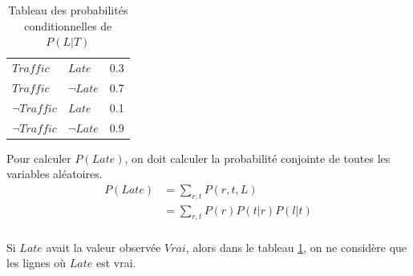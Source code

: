\begin{enumerate}
    \begin{table}[H]
        \centering
        \begin{tabular}{|l|l|l|}
            \hline
            $Traffic$ & $Late$ & 0.3 \\ 
            $Traffic$ & $\neg Late$ & 0.7 \\
            $\neg Traffic$ & $Late$ & 0.1 \\
            $\neg Traffic$ & $\neg Late$ & 0.9 \\
            \hline
        \end{tabular}
        \caption{Tableau des probabilités conditionnelles de $P(L | T)$}
        \label{tabl:late}
    \end{table}
    Pour calculer $P(Late)$, on doit calculer la probabilité conjointe de toutes les variables aléatoires. 
    \begin{align*}
        P(Late) &= \sum_{r, t} P(r, t, L) \\
                &=\sum_{r,t} P(r) P(t|r) P(l|t) \\
    \end{align*}

    \begin{remark}\leavevmode
        Si $Late$ avait la valeur observée $Vrai$, alors  dans le tableau \ref{tabl:late}, on ne considère que les lignes où $Late$ est vrai.
    \end{remark}


\end{enumerate}
